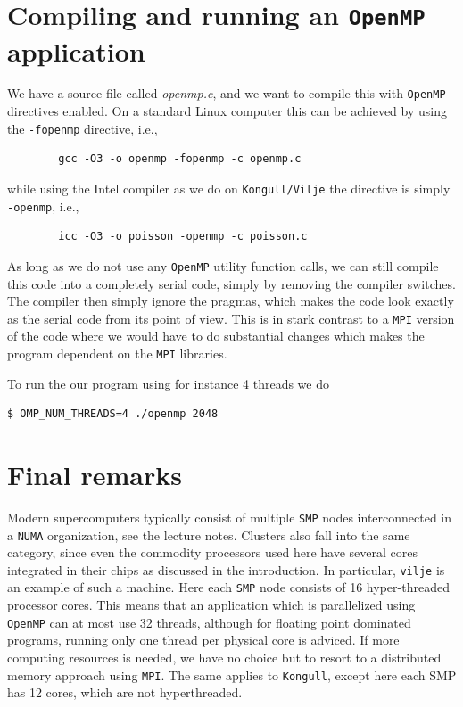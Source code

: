 \documentclass[twoside, 11pt, a4paper]{article}
\begin{document}
\section{Compiling and running an \texttt{OpenMP} application}
We have a source file called \emph{openmp.c}, and we want to compile this with \texttt{OpenMP} directives enabled.
On a standard Linux computer this can be achieved by using the \texttt{-fopenmp} directive, i.e.,
\begin{verbatim}
        gcc -O3 -o openmp -fopenmp -c openmp.c
\end{verbatim}
while using the Intel compiler as we do on \texttt{Kongull/Vilje} the directive is simply \texttt{-openmp}, i.e.,
\begin{verbatim}
        icc -O3 -o poisson -openmp -c poisson.c
\end{verbatim}
As long as we do not use any \texttt{OpenMP} utility function calls,
we can still compile this code into a completely serial code, simply by removing the compiler 
switches. The compiler then simply ignore the pragmas, which makes the code look exactly as the
serial code from its point of view. This is in stark contrast to a \texttt{MPI} version
of the code where we would have to do substantial changes which makes the program dependent on the \texttt{MPI} libraries.

To run the our program using for instance 4 threads we do
\begin{verbatim}
$ OMP_NUM_THREADS=4 ./openmp 2048
\end{verbatim}

\section{Final remarks}
Modern supercomputers typically consist of multiple \texttt{SMP} nodes interconnected in a
\texttt{NUMA} organization, see the lecture notes. Clusters also fall into the same category,
since even the commodity processors used here have several cores integrated in their chips
as discussed in the introduction. In particular, \texttt{vilje} is an example of such a machine.
Here each \texttt{SMP} node consists of 16 hyper-threaded processor cores. This means that an application which
is parallelized using \texttt{OpenMP} can at most use 32 threads, although for floating point dominated
programs, running only one thread per physical core is adviced. If more computing resources
is needed, we have no choice but to resort to a distributed memory approach using 
\texttt{MPI}. The same applies to \texttt{Kongull}, except here each SMP has 12 cores, which are not hyperthreaded.
\end{document}

